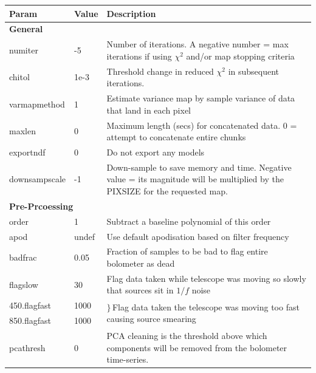 \documentclass[twoside,11pt]{article}
\renewcommand{\_}{\texttt{\symbol{95}}}
\begin{document}
\renewcommand*\arraystretch{0.85}
\begin{table}
\begin{center}
\begin{footnotesize}
\begin{tabular}{|p{2.2cm}|p{1.1cm}|p{11.4cm}|}
\hline
Param & Value & Description \\
\hline
\multicolumn{3}{|l|}{\textbf{General}}\\
\hline
numiter       &   -5 & Number of iterations. A negative number = max iterations
                       if using $\chi^2$ and/or map stopping criteria\\
chitol        & 1e-3 & Threshold change in reduced $\chi^2$ in subsequent
                       iterations.\\
varmapmethod  &    1 & Estimate variance map by sample variance of data that
                       land in each pixel\\
maxlen        &    0 & Maximum length (secs) for concatenated data. 0 = attempt
                       to concatenate entire chunks\\
exportndf     &    0 & Do not export any models\\
downsampscale &   -1 & Down-sample to save memory and time. Negative value = its
                       magnitude will be multiplied by the PIXSIZE for the
                       requested map.\\
\hline
\multicolumn{3}{|l|}{\textbf{Pre-Prcoessing}}\\
\hline
order         &    1  & Subtract a baseline polynomial of this order\\
apod          & undef & Use default apodisation based on filter frequency\\
badfrac       & 0.05  & Fraction of samples to be bad to flag entire bolometer
                        as dead\\
flagslow      &    30 & Flag data taken while telescope was moving so slowly
                        that sources sit in $1/f$ noise\\
450.flagfast  &  1000 & \multirow{2}{*}{{\large$\rbrace$}\,Flag data taken
                        the telescope was moving too fast causing source
                        smearing}\\
850.flagfast  &  1000 & \\
pcathresh     &     0 & PCA cleaning is the threshold above which components
                        will be removed from the bolometer time-series.\\

\end{tabular}
\end{footnotesize}
\end{center}
\end{table}
\end{document}
